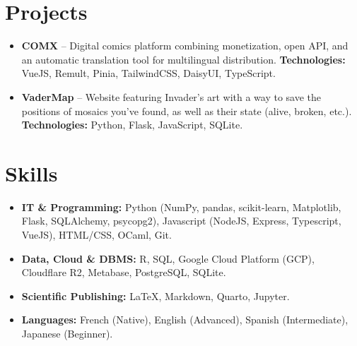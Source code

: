 \documentclass[11pt,a4paper]{article}
\begin{document}
\section*{Projects}
\vspace{-0.1cm}
\begin{itemize}[leftmargin=0.4cm, itemsep=4pt]
    \item \textbf{COMX} -- Digital comics platform combining monetization, open API, and an automatic translation tool for multilingual distribution.
    \textbf{Technologies:} VueJS, Remult, Pinia, TailwindCSS, DaisyUI, TypeScript.
    \item \textbf{VaderMap} -- Website featuring Invader's art with a way to save the positions of mosaics you've found, as well as their state (alive, broken, etc.).
    \textbf{Technologies:} Python, Flask, JavaScript, SQLite.
\end{itemize}

\vspace{0.2cm}

\section*{Skills}
\vspace{-0.2cm}
\begin{itemize}[leftmargin=0.4cm, itemsep=1pt]
    \item \textbf{IT \& Programming:} Python (NumPy, pandas, scikit-learn, Matplotlib, Flask, SQLAlchemy, psycopg2), Javascript (NodeJS, Express, Typescript, VueJS), HTML/CSS, OCaml, Git.
    \item \textbf{Data, Cloud \& DBMS:} R, SQL, Google Cloud Platform (GCP), Cloudflare R2, Metabase, PostgreSQL, SQLite.
    \item \textbf{Scientific Publishing:} \LaTeX, Markdown, Quarto, Jupyter.
    \item \textbf{Languages:} French (Native), English (Advanced), Spanish (Intermediate), Japanese (Beginner).
\end{itemize}
\end{document}
